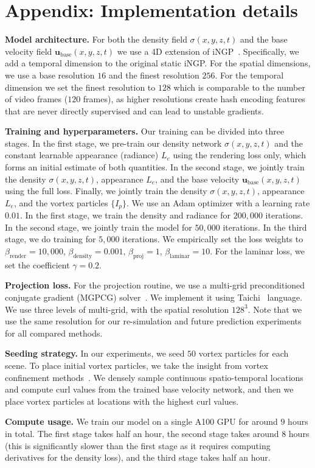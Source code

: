 \documentclass{article}
\newcommand{\myparagraph}[1]{\vspace{0.1cm}\noindent\textbf{#1}}
\begin{document}
{
\small



}

\newpage
\appendix 
\section{Appendix: Implementation details}
\myparagraph{Model architecture.}
For both the density field $\sigma(x,y,z,t)$ and the base velocity field $\mathbf{u}_\text{base}(x,y,z,t)$ we use a 4D extension of iNGP~\citep{muller2022instant}. Specifically, we add a temporal dimension to the original static iNGP. For the spatial dimensions, we use a base resolution $16$ and the finest resolution $256$. For the temporal dimension we set the finest resolution to $128$ which is comparable to the number of video frames ($120$ frames), as higher resolutions create hash encoding features that are never directly supervised and can lead to unstable gradients.

\myparagraph{Training and hyperparameters.} 
Our training can be divided into three stages. In the first stage, we pre-train our density network $\sigma(x,y,z,t)$ and the constant learnable appearance (radiance) $L_e$ using the rendering loss only, which forms an initial estimate of both quantities. In the second stage, we jointly train the density $\sigma(x,y,z,t)$, appearance $L_e$, and the base velocity $\mathbf{u}_\text{base}(x,y,z,t)$ using the full loss. Finally, we jointly train the density $\sigma(x,y,z,t)$, appearance $L_e$, and the vortex particles $\{I_p\}$. We use an Adam optimizer with a learning rate $0.01$. In the first stage, we train the density and radiance for $200,000$ iterations. In the second stage, we jointly train the model for $50,000$ iterations. In the third stage, we do training for $5,000$ iterations. We empirically set the loss weights to $\beta_\text{render}=10,000$, $\beta_\text{density}=0.001$, $\beta_\text{proj}=1$, $\beta_\text{laminar}=10$. For the laminar loss, we set the coefficient $\gamma=0.2$.

\myparagraph{Projection loss.}
For the projection routine, we use a multi-grid preconditioned conjugate gradient (MGPCG) solver~\citep{ashby1996parallel}. We implement it using Taichi~\citep{hu2019taichi} language. We use three levels of multi-grid, with the spatial resolution $128^3$. Note that we use the same resolution for our re-simulation and future prediction experiments for all compared methods.

\myparagraph{Seeding strategy.}
In our experiments, we seed $50$ vortex particles for each scene. To place initial vortex particles, we take the insight from vortex confinement methods~\citep{fedkiw2001visual}. We densely sample continuous spatio-temporal locations and compute curl values from the trained base velocity network, and then we place vortex particles at locations with the highest curl values.

\myparagraph{Compute usage.}
We train our model on a single A100 GPU for around $9$ hours in total. The first stage takes half an hour, the second stage takes around $8$ hours (this is significantly slower than the first stage as it requires computing derivatives for the density loss), and the third stage takes half an hour.
 
\end{document}
